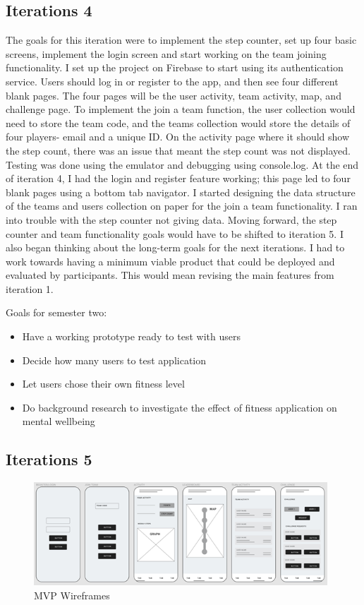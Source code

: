 \documentclass{l4proj}
\begin{document}
\subsection{Iterations 4}
The goals for this iteration were to implement the step counter, set up four basic screens, implement the login screen and start working on the team joining functionality. 
I set up the project on Firebase to start using its authentication service. Users should log in or register to the app, and then see four different blank pages. The four pages will be the user activity, team activity, map, and challenge page. To implement the join a team function, the user collection would need to store the team code, and the teams collection would store the details of four players- email and a unique ID. On the activity page where it should show the step count, there was an issue that meant the step count was not displayed. Testing was done using the emulator and debugging using console.log. 
At the end of iteration 4, I had the login and register feature working; this page led to four blank pages using a bottom tab navigator. I started designing the data structure of the teams and users collection on paper for the join a team functionality. I ran into trouble with the step counter not giving data. Moving forward, the step counter and team functionality goals would have to be shifted to iteration 5. I also began thinking about the long-term goals for the next iterations. I had to work towards having a minimum viable product that could be deployed and evaluated by participants. This would mean revising the main features from iteration 1. 

Goals for semester two: 
\begin{itemize}
\item Have a working prototype ready to test with users
\item Decide how many users to test application
\item Let users chose their own fitness level
\item Do background research to investigate the effect of fitness application on mental wellbeing
\end{itemize}

\subsection{Iterations 5}
  \begin{figure}[h]
    \centering
     \includegraphics[width=110mm]{dissertation/images/9.png}
     \caption{MVP Wireframes}
     \setlength{\belowcaptionskip}{-10pt}
     \label{fig: Forms of exercise}
 \end{figure}
 
\end{document}
